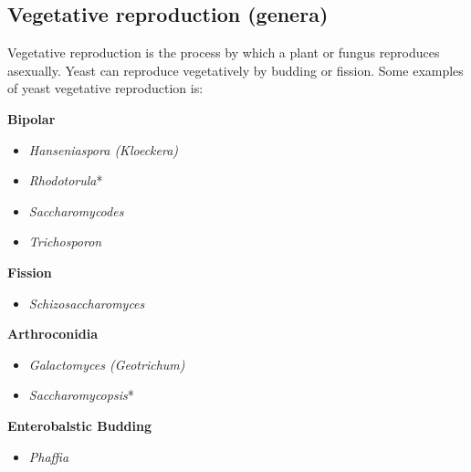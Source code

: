 \subsection{Vegetative reproduction (genera)}
Vegetative reproduction is the process by which a plant or fungus reproduces asexually. Yeast can reproduce vegetatively by budding or fission. Some examples of yeast vegetative reproduction is:

\begin{highlight}
    \begin{multicols}{2}
        \noindent
        \textbf{Bipolar}
        \begin{itemize}
            \item \textit{Hanseniaspora (Kloeckera)}
            \item \textit{Rhodotorula}*
            \item \textit{Saccharomycodes}
            \item \textit{Trichosporon}
        \end{itemize}
        
        \vspace{1em}

        \textbf{Fission}
        \begin{itemize}
            \item \textit{Schizosaccharomyces}
        \end{itemize}
        
        \vspace{1em}

        \textbf{Arthroconidia}
        \begin{itemize}
            \item \textit{Galactomyces (Geotrichum)}
            \item \textit{Saccharomycopsis}*
        \end{itemize}
        
        \vspace{1em}

        \textbf{Enterobalstic Budding}
        \begin{itemize}
            \item \textit{Phaffia}
        \end{itemize}
        
        \columnbreak
        

\end{multicols}
\end{highlight}
